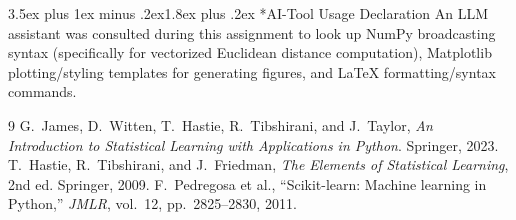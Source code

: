 \documentclass[10pt,twocolumn,letterpaper]{article}
\makeatletter
\renewcommand\section{\@startsection{section}{1}{\z@}%
  {3.5ex plus 1ex minus .2ex}{1.8ex plus .2ex}%
  {\centering\normalfont\normalsize\scshape}}
\makeatother
\begin{document}
\section*{AI-Tool Usage Declaration}
An LLM assistant was consulted during this assignment to look up NumPy broadcasting syntax (specifically for vectorized Euclidean distance computation), Matplotlib plotting/styling templates for generating figures, and LaTeX formatting/syntax commands.

\begin{thebibliography}{9}
 G.~James, D.~Witten, T.~Hastie, R.~Tibshirani, and J.~Taylor,
  \textit{An Introduction to Statistical Learning with Applications in Python}. Springer, 2023.
 T.~Hastie, R.~Tibshirani, and J.~Friedman,
  \textit{The Elements of Statistical Learning}, 2nd ed. Springer, 2009.
 F.~Pedregosa et al., ``Scikit-learn: Machine learning in Python,''
  \textit{JMLR}, vol.~12, pp.~2825--2830, 2011.
\end{thebibliography}
\end{document}
